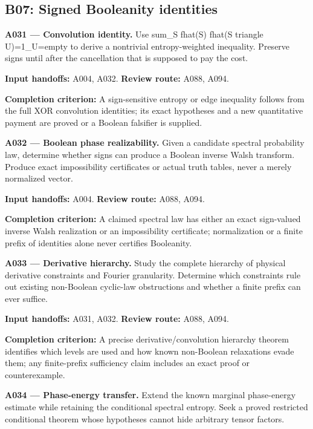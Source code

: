 \documentclass[11pt]{article}
\begin{document}
\subsection{B07: Signed Booleanity identities}

\textbf{A031 --- Convolution identity.} Use sum\_S fhat(S) fhat(S triangle U)=1\_{U=empty} to derive a nontrivial entropy-weighted inequality. Preserve signs until after the cancellation that is supposed to pay the cost.

{\small\color{ink}\textbf{Input handoffs:} A004, A032. \textbf{Review route:} A088, A094.\par
\textbf{Completion criterion:} A sign-sensitive entropy or edge inequality follows from the full XOR convolution identities; its exact hypotheses and a new quantitative payment are proved or a Boolean falsifier is supplied.\par}



\textbf{A032 --- Boolean phase realizability.} Given a candidate spectral probability law, determine whether signs can produce a Boolean inverse Walsh transform. Produce exact impossibility certificates or actual truth tables, never a merely normalized vector.

{\small\color{ink}\textbf{Input handoffs:} A004. \textbf{Review route:} A088, A094.\par
\textbf{Completion criterion:} A claimed spectral law has either an exact sign-valued inverse Walsh realization or an impossibility certificate; normalization or a finite prefix of identities alone never certifies Booleanity.\par}



\textbf{A033 --- Derivative hierarchy.} Study the complete hierarchy of physical derivative constraints and Fourier granularity. Determine which constraints rule out existing non-Boolean cyclic-law obstructions and whether a finite prefix can ever suffice.

{\small\color{ink}\textbf{Input handoffs:} A031, A032. \textbf{Review route:} A088, A094.\par
\textbf{Completion criterion:} A precise derivative/convolution hierarchy theorem identifies which levels are used and how known non-Boolean relaxations evade them; any finite-prefix sufficiency claim includes an exact proof or counterexample.\par}



\textbf{A034 --- Phase-energy transfer.} Extend the known marginal phase-energy estimate while retaining the conditional spectral entropy. Seek a proved restricted conditional theorem whose hypotheses cannot hide arbitrary tensor factors.
\end{document}

